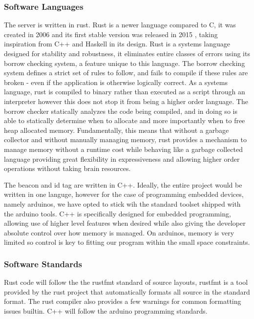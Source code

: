 \subsubsection{Software Languages}
The server is written in rust.
Rust is a newer language compared to C, it was created in 2006 \cite{rust_graydon_interview} and its first stable version was released in 2015 \cite{rust_releases}, taking inspiration from C++ and Haskell in its design.
Rust is a systems language designed for stability and robustness, it eliminates entire classes of errors using its borrow checking system, a feature unique to this language.
The borrow checking system defines a strict set of rules to follow, and fails to compile if these rules are broken - even if the application is otherwise logically correct.
As a systems language, rust is compiled to binary rather than executed as a script through an interpreter however this does not stop it from being a higher order language.
The borrow checker statically analyzes the code being compiled, and in doing so is able to statically determine when to allocate and more importantly when to free heap allocated memory.
Fundamentally, this means that without a garbage collector and without manually managing memory, rust provides a mechanism to manage memory without a runtime cost while behaving like a garbage collected language providing great flexibility in expressiveness and allowing higher order operations without taking brain resources.
\smallskip

The beacon and id tag are written in C++.
Ideally, the entire project would be written in one languge, however for the case of programming embedded devices, namely arduinos, we have opted to stick wih the standard toolset shipped with the arduino tools.
C++ is specifically designed for embedded programming, allowing use of higher level features when desired while also giving the developer absolute control over how memory is managed.
On arduinos, memory is very limited so control is key to fitting our program within the small space constraints.


\bigskip
\subsubsection{Software Standards}
Rust code will follow the the rustfmt standard of source layouts, rustfmt is a tool provided by the rust project that automatically formats all source in the standard format. The rust compiler also provides a few warnings for common formatting issues builtin.
\smallskip
C++ will follow the arduino programming standards.

